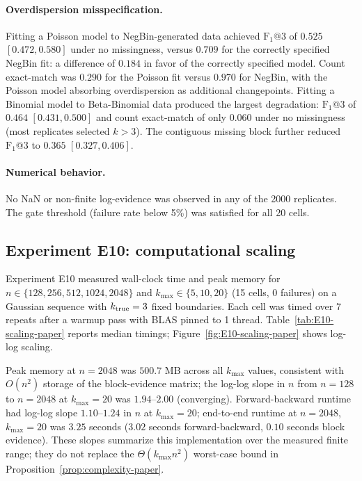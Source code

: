 \paragraph{Overdispersion misspecification.}
Fitting a Poisson model to NegBin-generated data achieved $\mathrm{F}_1@3$
of $0.525$ $[0.472, 0.580]$ under no missingness, versus $0.709$ for the
correctly specified NegBin fit: a difference of $0.184$ in favor of the
correctly specified model.
Count exact-match was $0.290$ for the Poisson fit versus $0.970$ for NegBin,
with the Poisson model absorbing overdispersion as additional changepoints.
Fitting a Binomial model to Beta-Binomial data produced the largest
degradation: $\mathrm{F}_1@3$ of $0.464$ $[0.431, 0.500]$ and count
exact-match of only $0.060$ under no missingness (most replicates selected
$k>3$). The contiguous missing block further reduced $\mathrm{F}_1@3$ to
$0.365$ $[0.327, 0.406]$.

\paragraph{Numerical behavior.}
No NaN or non-finite log-evidence was observed in any of the 2000 replicates.
The gate threshold (failure rate below 5\%) was satisfied for all 20 cells.





\FloatBarrier
\subsection{Experiment E10: computational scaling}
\label{sec:e10}
Experiment E10 measured wall-clock time and peak memory for $n\in\{128,256,512,1024,2048\}$ and $k_{\max}\in\{5,10,20\}$ (15 cells, 0 failures) on a Gaussian sequence with $k_{\rm true}=3$ fixed boundaries. Each cell was timed over 7 repeats after a warmup pass with BLAS pinned to 1 thread. Table~\ref{tab:E10-scaling-paper} reports median timings; Figure~\ref{fig:E10-scaling-paper} shows log-log scaling.

Peak memory at $n=2048$ was $500.7$ MB across all $k_{\max}$ values, consistent with $O(n^2)$ storage of the block-evidence matrix; the log-log slope in $n$ from $n=128$ to $n=2048$ at $k_{\max}=20$ was $1.94$--$2.00$ (converging). Forward-backward runtime had log-log slope $1.10$--$1.24$ in $n$ at $k_{\max}=20$; end-to-end runtime at $n=2048$, $k_{\max}=20$ was $3.25$ seconds ($3.02$ seconds forward-backward, $0.10$ seconds block evidence). These slopes summarize this implementation over the measured finite range; they do not replace the $\Theta(k_{\max}n^2)$ worst-case bound in Proposition~\ref{prop:complexity-paper}.

